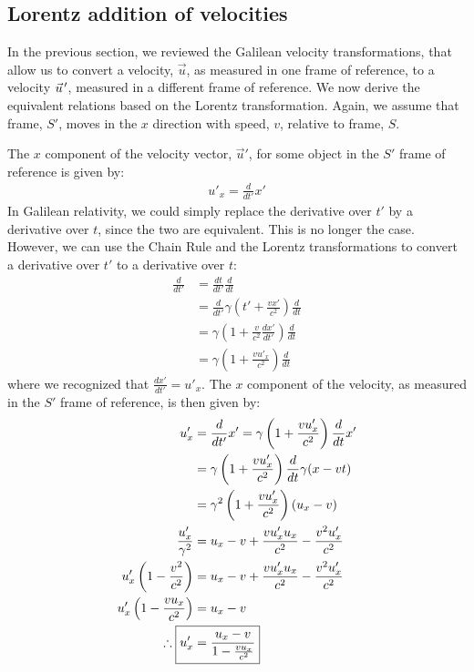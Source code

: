 \subsection{Lorentz addition of velocities}
In the previous section, we reviewed the Galilean velocity transformations, that allow us to convert a velocity, $\vec u$, as measured in one frame of reference, to a velocity $\pvec u'$, measured in a different frame of reference. We now derive the equivalent relations based on the Lorentz transformation. Again, we assume that frame, $S'$, moves in the $x$ direction with speed, $v$, relative to frame, $S$. 

The $x$ component of the velocity vector, $\vec u'$, for some object in the $S'$ frame of reference is given by:
\begin{align*}
u'_x = \frac{d}{dt'} x'
\end{align*}
In Galilean relativity, we could simply replace the derivative over $t'$ by a derivative over $t$, since the two are equivalent. This is no longer the case. However, we can use the Chain Rule and the Lorentz transformations to convert a derivative over $t'$ to a derivative over $t$:
\begin{align*}
\frac{d}{dt'} &= \frac{dt}{dt'}\frac{d}{dt}\\
&= \frac{d}{dt'} \gamma\left(t'+\frac{vx'}{c^2} \right)\frac{d}{dt}\\
&=\gamma \left(1+\frac{v}{c^2}\frac{dx'}{dt'}\right)\frac{d}{dt}\\
&=\gamma \left(1+\frac{vu'_x}{c^2}\right)\frac{d}{dt}
\end{align*}
where we recognized that $\frac{dx'}{dt'}=u'_x$. The $x$ component of the velocity, as measured in the $S'$ frame of reference, is then given by:
\begin{align*}
u'_x &= \frac{d}{dt'} x' = \gamma \left(1+\frac{vu'_x}{c^2}\right)\frac{d}{dt}x'\\
&=\gamma \left(1+\frac{vu'_x}{c^2}\right)\frac{d}{dt}\gamma (x-vt)\\
&=\gamma^2 \left(1+\frac{vu'_x}{c^2}\right)(u_x -v)\\
\frac{u'_x}{\gamma^2}&=u_x -v +\frac{vu'_xu_x}{c^2}-\frac{v^2u'_x}{c^2}\\
u'_x\left (1-\frac{v^2}{c^2}\right)&=u_x -v +\frac{vu'_xu_x}{c^2}-\frac{v^2u'_x}{c^2}\\
u'_x \left( 1- \frac{vu_x}{c^2}\right) &=u_x -v\\
\therefore \; \Aboxed{u'_x&=\frac{u_x -v}{1- \frac{vu_x}{c^2}}}
\end{align*}
